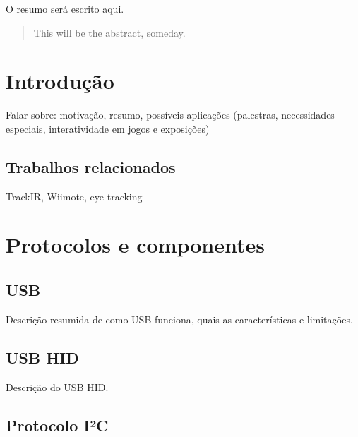 \documentclass[brazil,pagestart=firstchapter]{abnt}
\begin{document}
\begin{resumo}
O resumo será escrito aqui.
\end{resumo}

\begin{abstract}
This will be the abstract, someday.
\end{abstract}


\listadesiglas

\listoffigures



\tableofcontents{}


\chapter{Introdução\label{cap:introducao}}

Falar sobre: motivação, resumo, possíveis aplicações (palestras,
necessidades especiais, interatividade em jogos e exposições)

\section{Trabalhos relacionados\label{sec:trabalhos_relacionados}}

TrackIR, Wiimote, eye-tracking


\chapter{Protocolos e componentes\label{cap:protocolos_e_componentes}}

\section{USB\label{sec:usb}}

Descrição resumida de como USB funciona, quais as características e
limitações.

\section{USB HID\label{sec:usb_hid}}

Descrição do USB HID.

\section{Protocolo I²C\label{sec:i2c}}
\end{document}
